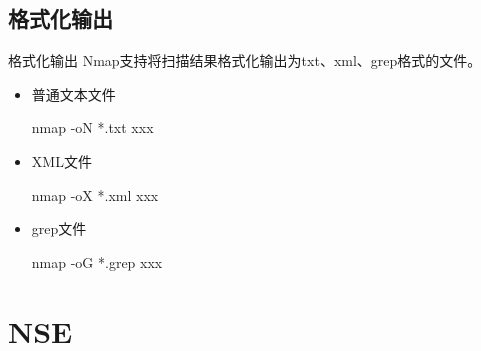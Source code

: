 \documentclass{beamer}
\begin{document}
\subsection{格式化输出}
\begin{frame}
\end{frame}
\begin{frame}{格式化输出}
Nmap支持将扫描结果格式化输出为txt、xml、grep格式的文件。
\begin{itemize}
\item 普通文本文件

nmap -oN *.txt xxx
\item XML文件

nmap -oX *.xml xxx
\item grep文件

nmap -oG *.grep xxx
\end{itemize}
\end{frame}
\section{NSE}
\begin{frame}
\end{frame}
\end{document}
